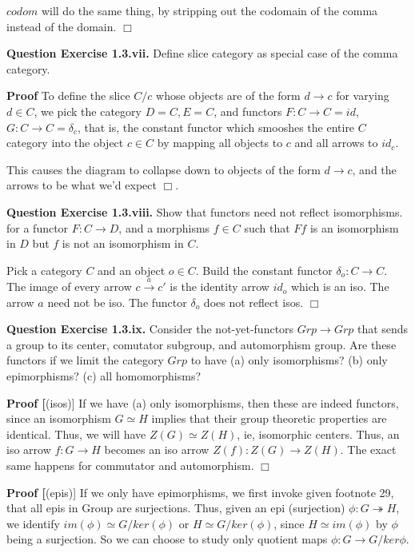 \documentclass[11pt]{report}
\def\qed{$\Box$}
\newcommand*{\question}[1]{\leavevmode\newline \textbf{Question #1.}}
\newcommand*{\proof}[1]{\leavevmode\newline \textbf{Proof #1}}
\begin{document}
$codom$ will do the same thing, by stripping out the codomain of the comma instead of the domain. \qed

\question{Exercise 1.3.vii} Define slice category as special case of the comma category.


\proof{} To define the slice $C/c$ whose objects are of the form $d \rightarrow c$ for varying $d \in C$, we pick
the category $D = C, E = C$, and functors $F : C \rightarrow C = id$, $G : C \rightarrow C = \delta_c$, that is, the constant functor
which smooshes the entire $C$ category into the object $c \in C$ by mapping all objects to $c$ and all arrows to $id_{c}$.

This causes the diagram to collapse down to objects of the form $d \rightarrow c$, and the arrows to be what we'd expect \qed.

\question{Exercise 1.3.viii} Show that functors need not reflect isomorphisms. for a functor $F: C \rightarrow D$, and a 
morphisms $f \in C$ such that $F f$ is an isomorphism in $D$ but $f$ is not an isomorphism in $C$.


Pick a category $C$ and an object $o \in C$. Build the constant functor $\delta_o: C \rightarrow C$. The image
of every arrow $c \xrightarrow{a} c'$ is the identity arrow $id_o$ which is an iso. The arrow $a$ need not be iso. The functor
$\delta_o$ does not reflect isos. \qed

\question{Exercise 1.3.ix} Consider the not-yet-functors $Grp \rightarrow Grp$ that sends a group to its center, comutator subgroup, and automorphism group.
Are these functors if we limit the category $Grp$ to have (a) only isomorphisms? (b) only epimorphisms? (c) all homomorphisms?

\proof[(isos)] If we have (a) only isomorphisms, then these are indeed functors, since an isomorphism $G \simeq H$
implies that their group theoretic properties are identical. Thus, we will have
$Z(G) \simeq Z(H)$, ie, isomorphic centers.
Thus, an iso arrow $f: G \rightarrow H$ becomes an iso arrow
$Z(f) : Z(G) \rightarrow Z(H)$. The exact same happens for commutator and automorphism. \qed

\proof[(epis)] If we only have epimorphisms, we first invoke  given footnote 29, that all
epis in Group are surjections. Thus, given an epi (surjection) $\phi: G \twoheadrightarrow H$, we
identify $im(\phi) \simeq G/ker(\phi)$ or $H \simeq G/ker(\phi)$, since $H \simeq im(\phi)$ by $\phi$ being a surjection.
So we can choose to study only quotient maps $\phi: G \rightarrow G/ker \phi$.
\end{document}
